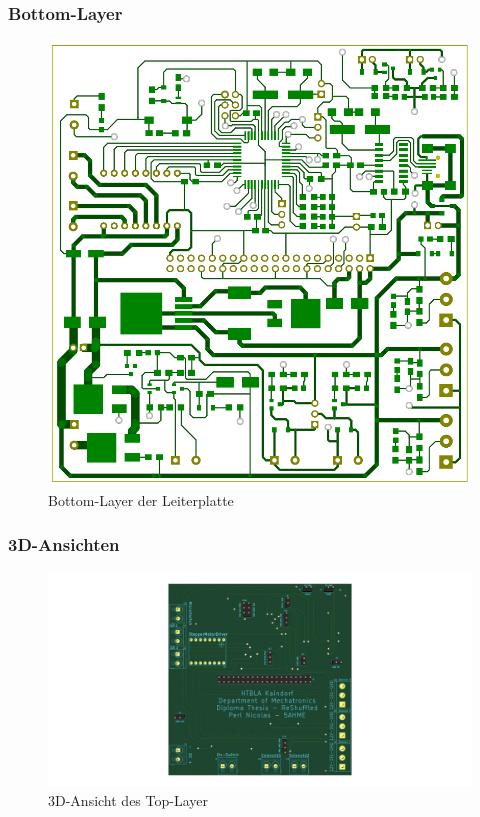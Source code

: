 \subsubsection{Bottom-Layer}

\begin{figure}[hbt]
    \centering
    \includegraphics[scale=0.26]{fig/elektro/BotLayer.png}
    \caption{Bottom-Layer der Leiterplatte}
\end{figure}

\newpage
\subsubsection{3D-Ansichten}

\begin{figure}[hb]
    \includegraphics[scale=0.24]{fig/elektro/PlatineTop.jpg}
    \caption{3D-Ansicht des Top-Layer}
\end{figure}

